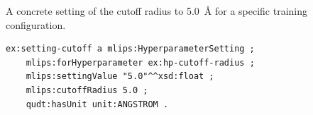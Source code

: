 A concrete setting of the cutoff radius to 5.0~\AA{} for a specific training configuration.
\begin{lstlisting}[language=turtle]
ex:setting-cutoff a mlips:HyperparameterSetting ;
    mlips:forHyperparameter ex:hp-cutoff-radius ;
    mlips:settingValue "5.0"^^xsd:float ;
    mlips:cutoffRadius 5.0 ;
    qudt:hasUnit unit:ANGSTROM .
\end{lstlisting}
